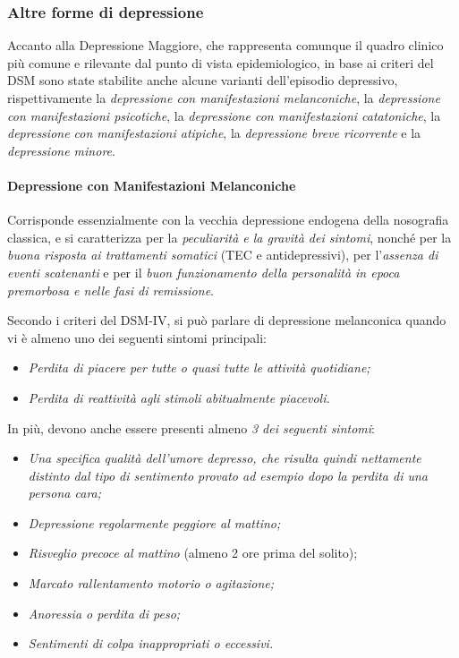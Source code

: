 \subsubsection{Altre forme di depressione}

Accanto alla Depressione Maggiore, che rappresenta comunque il quadro
clinico più comune e rilevante dal punto di vista epidemiologico, in
base ai criteri del DSM sono state stabilite anche alcune varianti
dell'episodio depressivo, rispettivamente la \emph{depressione con
manifestazioni melanconiche}, la \emph{depressione con manifestazioni
psicotiche}, la \emph{depressione con manifestazioni catatoniche}, la
\emph{depressione con manifestazioni atipiche}, la \emph{depressione
breve ricorrente} e la \emph{depressione minore}.

\paragraph{Depressione con Manifestazioni Melanconiche}
  Corrisponde essenzialmente con la vecchia depressione endogena della
  nosografia classica, e si caratterizza per la \emph{peculiarità e la
  gravità dei sintomi}, nonché per la \emph{buona risposta ai
  trattamenti somatici} (TEC e antidepressivi), per l'\emph{assenza di
  eventi scatenanti} e per il \emph{buon funzionamento della personalità
  in epoca premorbosa e nelle fasi di remissione}.

  Secondo i criteri del DSM-IV, si può parlare di depressione
  melanconica quando vi è almeno uno dei seguenti sintomi principali:

\begin{itemize}
\item
  \emph{Perdita di piacere per tutte o quasi tutte le attività
  quotidiane;}
\item
  \emph{Perdita di reattività agli stimoli abitualmente piacevoli.}
\end{itemize}

In più, devono anche essere presenti almeno \emph{3 dei seguenti
sintomi}:

\begin{itemize}
\item
  \emph{Una specifica qualità dell'umore depresso, che risulta quindi
  nettamente distinto dal tipo di sentimento provato ad esempio dopo la
  perdita di una persona cara;}
\item
  \emph{Depressione regolarmente peggiore al mattino;}
\item
  \emph{Risveglio precoce al mattino} (almeno 2 ore prima del solito);
\item
  \emph{Marcato rallentamento motorio o agitazione;}
\item
  \emph{Anoressia o perdita di peso;}
\item
  \emph{Sentimenti di colpa inappropriati o eccessivi.}
\end{itemize}

